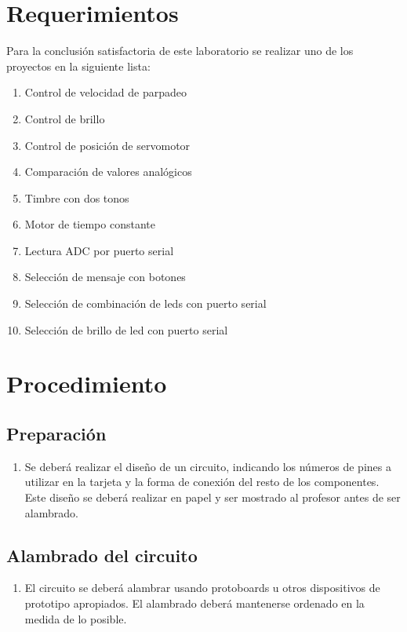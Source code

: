 \documentclass[12pt,letterpaper]{IEEEtran}
\begin{document}
\section{Requerimientos}

Para la conclusión satisfactoria de este laboratorio se realizar uno de los proyectos en la siguiente lista:

\begin{enumerate}
	\item Control de velocidad de parpadeo
	\item Control de brillo
    \item Control de posición de servomotor
    \item Comparación de valores analógicos
    \item Timbre con dos tonos
    \item Motor de tiempo constante
    \item Lectura ADC por puerto serial
    \item Selección de mensaje con botones
    \item Selección de combinación de leds con puerto serial
    \item Selección de brillo de led con puerto serial
\end{enumerate}

\section{Procedimiento}


\subsection{Preparación}

\begin{enumerate}
	\item Se deberá realizar el diseño de un circuito, indicando los números de pines a utilizar en la tarjeta y la forma de conexión del resto de los componentes. Este diseño se deberá realizar en papel y ser mostrado al profesor antes de ser alambrado.

\end{enumerate}

\subsection{Alambrado del circuito}

\begin{enumerate}[resume]
	\item El circuito se deberá alambrar usando protoboards u otros dispositivos de prototipo apropiados. El alambrado deberá mantenerse ordenado en la medida de lo posible.
\end{enumerate}
\end{document}
